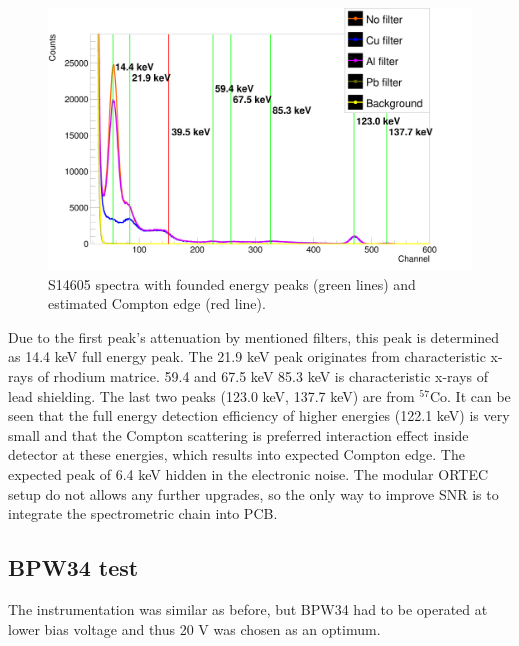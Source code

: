 \begin{figure}[H]
 \centering
 \includegraphics[scale=0.125, angle = 0]{./pictures/S14GammaTest.png}
 \caption{S14605 spectra with founded energy peaks (green lines) and estimated Compton edge (red line).}
 \label{S14605 spectra}
 
\end{figure}


\par

Due to the first peak's attenuation by mentioned filters, this peak is determined as 14.4 keV full energy peak. The 21.9 keV peak originates from characteristic x-rays of rhodium matrice. 59.4 and 67.5 keV 85.3 keV is characteristic x-rays of lead shielding. The last two peaks (123.0 keV, 137.7 keV) are from $^{57}$Co. It can be seen that the full energy detection efficiency of higher energies (122.1 keV) is very small and that the Compton scattering is preferred interaction effect inside detector at these energies, which results into expected Compton edge. The expected peak of 6.4 keV hidden in the electronic noise. The modular ORTEC setup do not allows any further upgrades, so the only way to improve SNR is to integrate the spectrometric chain into PCB. 

\subsection{BPW34 test}
The instrumentation was similar as before, but BPW34 had to be operated at lower bias voltage and thus 20 V was chosen as an optimum.

